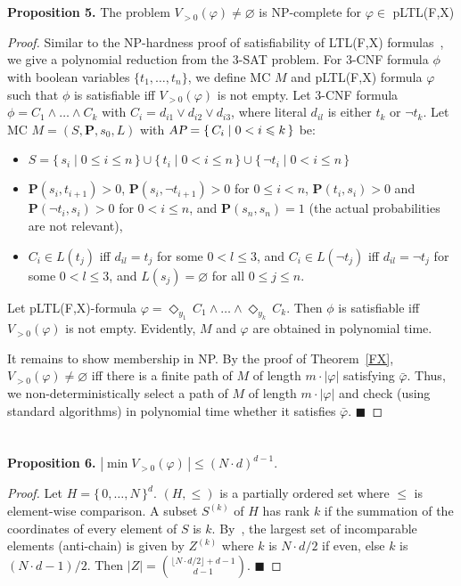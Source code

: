 \documentclass{llncs}
\def\bfP{\mathbf{P}}
\newcommand{\AP}{\mbox{\sl AP}}
\newcommand{\set}[1]{\{ \, #1 \, \}}
\renewcommand{\leq}{\leqslant}
\renewcommand{\emptyset}{\varnothing}
\newcommand{\de}{\Diamond}
\begin{document}
\section{}
\textbf{Proposition 5.} The problem $V_{>0}(\varphi)\neq \emptyset$ is NP-complete for $\varphi \in$ pLTL(F,X)
\begin{proof}
 Similar to the NP-hardness proof of satisfiability of LTL(F,X) formulas~\cite[Th.\ 3.7]{SistlaClarke85}, we give a polynomial reduction from the 3-SAT problem.
For 3-CNF formula $\phi$ with boolean variables $\{t_1,\hdots,t_n\}$, 
we define MC $M$ and pLTL(F,X) formula $\varphi$  such that $\phi$ is satisfiable iff  $V_{>0}(\varphi)$ is not empty.
Let 3-CNF formula $\phi = C_1 \wedge \hdots \wedge C_k$ with $C_i = d_{i1} \vee d_{i2} \vee d_{i3}$, 
where literal $d_{il}$ is either $t_k$ or $\neg t_k$.
Let MC $M = (S, \bfP, s_0, L)$ with $\AP = \set{C_i \mid 0 < i \leq k}$ be:
\begin{itemize}
\item 
$S = \set{s_i \mid 0 \leq i \leq n} \cup \set{t_i \mid 0 < i \leq n} \cup \set{\neg t_i \mid 0 < i \leq n}$
\item 
$\bfP(s_i,t_{i+1})>0$, $\mathbf P(s_i,\neg t_{i+1}) > 0$ for $0 \leq i < n$, $\bfP(t_i,s_i) > 0$ and $\bfP(\neg t_i,s_i) > 0$ for $0 < i \leq n$, 
and $\bfP(s_n,s_n)=1$ (the actual probabilities are not relevant), 
\item
$C_i \in L(t_j)$ iff $d_{il} = t_j$ for some $0 < l \leq 3$, and $C_i \in L(\neg t_j)$ iff $d_{il} = \neg t_j$ for some $0 < l \leq 3$, and
$L(s_j) = \emptyset$ for all $0 \leq j \leq n$.
\end{itemize}
Let pLTL(F,X)-formula $\varphi = \de_{y_1} \, C_1 \wedge \ldots \wedge \de_{y_k} \, C_k$. 
Then $\phi$ is satisfiable iff $ V_{>0}(\varphi)$ is not empty. Evidently, $M$ and $\varphi$ are obtained in polynomial time.

It remains to show membership in NP.
By the proof of Theorem~\ref{FX}, $V_{>0}(\varphi) \neq \emptyset$ iff there is a finite path of $M$ of length $m{\cdot}|\varphi|$ satisfying 
$\bar\varphi$. 
Thus, we non-deterministically select a path of $M$ of length $m{\cdot}|\varphi|$ and check (using standard algorithms) in polynomial time whether 
it satisfies $\bar\varphi$.  \hfill $\blacksquare$
\end{proof}

\section{}
\textbf{Proposition 6.} $|\min V_{>0}(\varphi) \, | \leq (N{\cdot}d)^{d{-}1}$.
\begin{proof}   
Let  $H= \set{0, \ldots, N}^d$. $(H, \leq)$ is a partially ordered set where $\leq$ is element-wise comparison. A subset $S^{(k)}$ of $H$ has rank $k$ if the summation of the coordinates of every element of $S$ is $k$.
By~\cite{K1978}, the largest set of incomparable elements (anti-chain) is given by $Z^{(k)}$ where $k$ is $N{\cdot}d/2$ if even, else $k$ is $(N{\cdot}d{-}1)/2$. Then $|Z| = {\lfloor N{\cdot}d/2\rfloor + d-1 \choose d-1}.$ \hfill $\blacksquare$\end{proof} 
\end{document}
